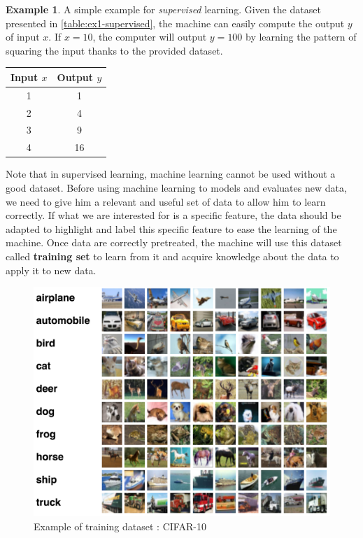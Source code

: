 \documentclass[11pt, openany]{report}
\theoremstyle{plain}
\theoremstyle{definition}
\newtheorem{exmp}{Example}[section]
\theoremstyle{remark}
\begin{document}
\begin{exmp}
A simple example for \textit{supervised} learning. Given the dataset presented in \autoref{table:ex1-supervised}, the machine can easily compute the output $y$ of input $x$. 
If $x = 10$, the computer will output $y = 100$ by learning the pattern of squaring the input thanks to the provided dataset.  

\newpage
\begin{center}
    \begin{tabular}{|c|c|}
      \hline
      Input $x$ & Output $y$ \\
      \hline
      1 & 1 \\
      \hline
      2 & 4 \\
      \hline
      3 & 9 \\
      \hline
      4 & 16 \\
      \hline
    \end{tabular}
    \label{table:ex1-supervised}
\end{center}
\end{exmp}

Note that in supervised learning, machine learning cannot be used without a good dataset. Before using machine learning to models and evaluates new data, we need to give him a relevant and useful set of data to allow him to learn correctly. If what we are interested for is a specific feature, the data should be adapted to highlight and label this specific feature to ease the learning of the machine. Once data are correctly pretreated, the machine will use this dataset called \textbf{training set} to learn from it and acquire knowledge about the data to apply it to new data.

\begin{figure}[h]
  \centering
  \includegraphics[scale=0.25]{figures/cifar10.png}
  \caption{Example of training dataset : CIFAR-10}
  \label{fig:cifar10}
\end{figure}
\end{document}
